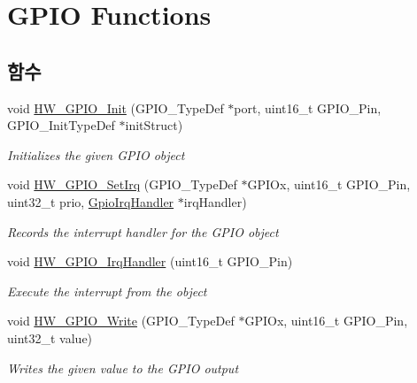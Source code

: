 \hypertarget{group___lory_s_d_k___g_p_i_o___functions}{}\section{G\+P\+IO Functions}
\label{group___lory_s_d_k___g_p_i_o___functions}
\subsection*{함수}
\begin{DoxyCompactItemize}
\item 
void \mbox{\hyperlink{group___lory_s_d_k___g_p_i_o___functions_ga2c3bac7bc9d78434e5e8ec915d1a933b}{H\+W\+\_\+\+G\+P\+I\+O\+\_\+\+Init}} (G\+P\+I\+O\+\_\+\+Type\+Def $\ast$port, uint16\+\_\+t G\+P\+I\+O\+\_\+\+Pin, G\+P\+I\+O\+\_\+\+Init\+Type\+Def $\ast$init\+Struct)
\begin{DoxyCompactList}\small\item\em Initializes the given G\+P\+IO object \end{DoxyCompactList}\item 
void \mbox{\hyperlink{group___lory_s_d_k___g_p_i_o___functions_ga1dcd4c3db791178fee479a8e54155573}{H\+W\+\_\+\+G\+P\+I\+O\+\_\+\+Set\+Irq}} (G\+P\+I\+O\+\_\+\+Type\+Def $\ast$G\+P\+I\+Ox, uint16\+\_\+t G\+P\+I\+O\+\_\+\+Pin, uint32\+\_\+t prio, \mbox{\hyperlink{hw__gpio_8h_a9984a02338950deee6416208cdc73a08}{Gpio\+Irq\+Handler}} $\ast$irq\+Handler)
\begin{DoxyCompactList}\small\item\em Records the interrupt handler for the G\+P\+IO object \end{DoxyCompactList}\item 
void \mbox{\hyperlink{group___lory_s_d_k___g_p_i_o___functions_ga9e4743d66ccc7e19b6cf051376ff5ce0}{H\+W\+\_\+\+G\+P\+I\+O\+\_\+\+Irq\+Handler}} (uint16\+\_\+t G\+P\+I\+O\+\_\+\+Pin)
\begin{DoxyCompactList}\small\item\em Execute the interrupt from the object \end{DoxyCompactList}\item 
void \mbox{\hyperlink{group___lory_s_d_k___g_p_i_o___functions_ga64b37e6d4da7e8f148c92f898aed98de}{H\+W\+\_\+\+G\+P\+I\+O\+\_\+\+Write}} (G\+P\+I\+O\+\_\+\+Type\+Def $\ast$G\+P\+I\+Ox, uint16\+\_\+t G\+P\+I\+O\+\_\+\+Pin, uint32\+\_\+t value)
\begin{DoxyCompactList}\small\item\em Writes the given value to the G\+P\+IO output \end{DoxyCompactList}\item 

\end{DoxyCompactItemize}
